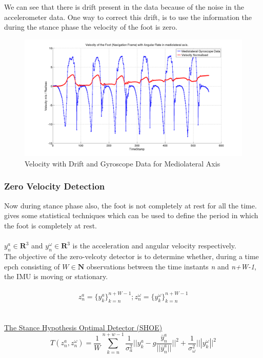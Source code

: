 \documentclass[12pt]{article}
\begin{document}
\FloatBarrier

We can see that there is drift present in the data because of the noise in the accelerometer data. One way to correct this drift, is to use the information the during the stance phase the velocity of the foot is zero.

\begin{figure}[!htb]
\centering
\includegraphics[scale=.3]{velocityDriftGyro.png}
\caption{Velocity with Drift and Gyroscope Data for Mediolateral Axis}
\label{velocityDriftGyro}
\end{figure}

\FloatBarrier

\subsubsection*{Zero Velocity Detection}
Now  during stance phase also, the foot is not completely at rest for all the time. \cite{5646936} gives some statistical techniques which can be used to define the period in which the foot is completely at rest.\\\\
$ y_n^a \in \mathbf{R}^3 $  and $ y_n^{\omega} \in \mathbf{R}^3 $ is the acceleration and angular velocity respectively. \\
The objective of the zero-velcoty detector is to determine whether, during a time epch consisting of $ W \in \mathbf{N} $ observations between the time instants \textit{n} and \textit{n+W-1}, the IMU is moving or stationary.\\\\
\begin{equation}
 z_n^a = \{y_k^a\}_{k=n}^{n+W-1} ;
 z_n^{\omega} = \{y_k^\omega\}_{k=n}^{n+W-1}
\end{equation}
\\\\
\underline{The Stance Hypothesis Optimal Detector (SHOE)}
\begin{equation}
T(z_n^a,z_n^{\omega})=\frac{1}{W} \sum_{k=n}^{n+w-1}\frac{1}{\sigma_a^2}||y_k^a-g\frac{\bar{y}_n^a}{||\bar{y}_n^a||}||^2 +\frac{1}{\sigma_{\omega}^2}|||y_k^{\omega}||^2
\end{equation}
\end{document}
